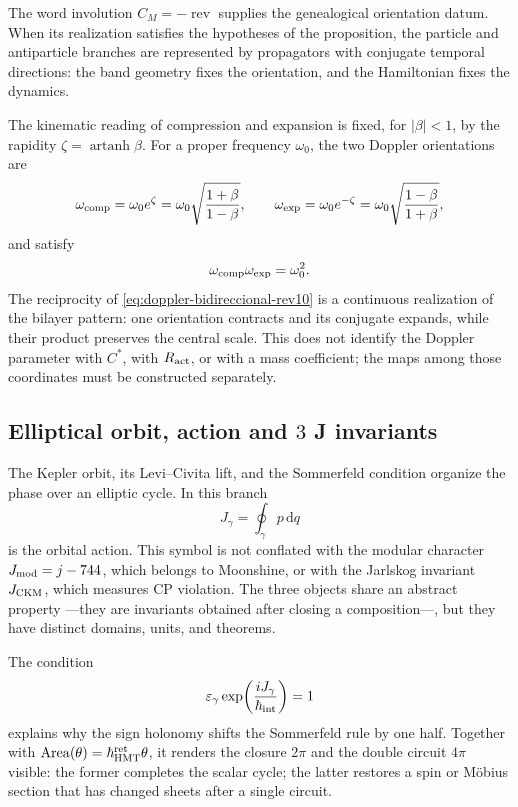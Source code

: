 The word involution \(C_M=-\operatorname{rev}\) supplies the genealogical
orientation datum. When its realization satisfies the hypotheses of
the proposition, the particle and antiparticle branches are represented by
propagators with conjugate temporal directions: the band geometry fixes the
orientation, and the Hamiltonian fixes the dynamics.

The kinematic reading of compression and expansion is fixed, for
\(|\beta|<1\), by the rapidity
\(\zeta=\operatorname{artanh}\beta\). For a proper frequency
\(\omega_0\), the two Doppler orientations are
\begin{equation}
 \omega_{\rm comp}=\omega_0e^{\zeta}
 =\omega_0\sqrt{\frac{1+\beta}{1-\beta}},\qquad
 \omega_{\rm exp}=\omega_0e^{-\zeta}
 =\omega_0\sqrt{\frac{1-\beta}{1+\beta}},
 \label{eq:doppler-bidireccional-rev10}
\end{equation}
and satisfy
\[
 \omega_{\rm comp}\omega_{\rm exp}=\omega_0^2.
\]
The reciprocity of \eqref{eq:doppler-bidireccional-rev10} is a continuous realization of the bilayer pattern: one orientation contracts and its conjugate expands, while their product preserves the central scale. This does not identify the Doppler parameter with \(C^*\), with \(R_{\rm act}\), or with a mass coefficient; the maps among those coordinates must be constructed separately.

\subsection{Elliptical orbit, action and \(3\) J invariants}

The Kepler orbit, its Levi--Civita lift, and the Sommerfeld condition organize the phase over an elliptic cycle. In this branch
\[
 J_\gamma=\oint_\gamma p\,\mathrm dq
\]
is the orbital action. This symbol is not conflated with the modular character \(J_{\rm mod}=j-744\), which belongs to Moonshine, or with the Jarlskog invariant \(J_{\rm CKM}\), which measures CP violation. The three objects share an abstract property ---they are invariants obtained after closing a composition---, but they have distinct domains, units, and theorems.

The condition
\[
 \varepsilon_\gamma
 \exp\!\left(\frac{iJ_\gamma}{\hbar_{\rm int}}\right)=1
\]
explains why the sign holonomy shifts the Sommerfeld rule by one half. Together with
\(\operatorname{Area}(\theta)=\hbar_{\rm HMT}^{\rm ret}\theta\), it renders the closure \(2\pi\) and the double circuit \(4\pi\) visible: the former completes
the scalar cycle; the latter restores a spin or Möbius section that
has changed sheets after a single circuit.

